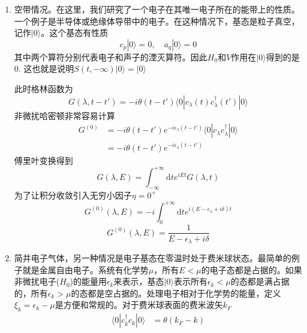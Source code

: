 \documentclass[a4paper,14pt]{article}
\begin{document}
\begin{enumerate}
    \item 空带情况。在这里，我们研究了一个电子在其唯一电子所在的能带上的性质。一个例子是半导体或绝缘体导带中的电子。在这种情况下，基态是粒子真空，记作$|0\rangle$。这个基态有性质
    \begin{equation*}
        c_p|0\rangle=0,\quad a_q|0\rangle=0
    \end{equation*}
    其中两个算符分别代表电子和声子的湮灭算符。因此$H_0$和$V$作用在$|0\rangle$得到的是$0$. 这也就是说明$S(t,-\infty)|0\rangle=|0\rangle$

    此时格林函数为
    \begin{equation*}
        G(\lambda,t-t')=-i\theta(t-t')\langle0|c_\lambda(t)c_\lambda^\dagger(t')|0\rangle
    \end{equation*}
    非微扰哈密顿非常容易计算
    \begin{equation*}
        \begin{split}
            G^{(0)}&=-i\theta(t-t')e^{-i\epsilon_\lambda(t-t')}\langle 0|c_\lambda c_\lambda^\dagger|0\rangle\\
            &=-i\theta(t-t')e^{-i\epsilon_\lambda(t-t')}
        \end{split}
    \end{equation*}
    傅里叶变换得到
    \begin{equation*}
        G(\lambda,E)=\int_{-\infty}^{+\infty}\mathrm{d}t e^{iEt}G(\lambda,t)
    \end{equation*}
    为了让积分收敛引入无穷小因子$\eta=0^+$
    \begin{equation*}
        G^{(0)}(\lambda,E)=-i\int_0^{+\infty}\mathrm{d}te^{i(E-\epsilon_\lambda+i\delta)t}
    \end{equation*}
    \begin{equation*}
        G^{(0)}(\lambda,E)=\frac{1}{E-\epsilon_\lambda+i\delta}
    \end{equation*}
    \item 简并电子气体，另一种情况是电子基态在零温时处于费米球状态。最简单的例子就是金属自由电子。系统有化学势$\mu$，所有$E<\mu$的电子态都是占据的。如果非微扰电子($H_0$)的能量用$\epsilon_k$来表示，基态$|0\rangle$表示所有$\epsilon_k<\mu$的态都是满占据的，所有$\epsilon_k>\mu$的态都是空占据的。处理电子相对于化学势的能量，定义$\xi_k=\epsilon_k-\mu$是方便和常规的。对于费米球表面的费米波矢$k_F$
    \begin{equation*}
        \begin{split}
            \langle0|c_k^\dagger c_k|0\rangle&=\theta(k_F-k)\\

\end{split}
\end{equation*}
\end{enumerate}
\end{document}

